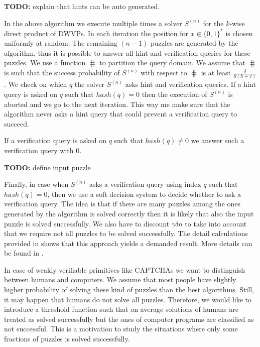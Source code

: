 \begin{todo}
  \textbf{TODO:} explain that hints can be auto generated.
\end{todo}

In the above algorithm we execute multiple times a solver $S^{(n)}$ for the $k$-wise direct product of DWVPs.
In each iteration the position for $x \in \{0,1\}^{*}$ is chosen uniformly at random.
The remaining $(n-1)$ puzzles are generated by the algorithm, thus it is possible to answer
all hint and verification queries for these puzzles.
We use a function $\hash$ to partition the query domain.
We assume that $\hash$ is such that the success probability of $S^{(n)}$ with respect to $\hash$ is at least $\frac{\delta}{8(h+v)}$.
We check on which $q$ the solver $S^{(n)}$ asks hint and verification queries.
If a hint query is asked on $q$ such that $hash(q) = 0$ then the execution of $S^{(n)}$
is aborted and we go to the next iteration. This way me make sure that the algorithm
never asks a hint query that could prevent a verification query to succeed.

If a verification query is asked on $q$ such that $hash(q) \neq 0$ we answer such a verification
query with $0$.

\begin{todo}
  \textbf{TODO:} define input puzzle
\end{todo}

Finally, in case when $S^{(n)}$ asks a verification query using index $q$ such that $hash(q) = 0$, then
we use a soft decision system to decide whether to ask a verification query.
The idea is that if there are many puzzles among the ones generated by the algorithm is solved correctly
then it is likely that also the input puzzle is solved successfully. We also have to discount
$\gamma\delta n$ to take into account that we require not all puzzles to be solved successfully.
The detail calculations provided in \cite{Dodis:2009:SAI:1530441.1530450} shows that this approach
yields a demanded result. More details can be found in \cite{Dodis:2009:SAI:1530441.1530450, impagliazzo2007chernoff}.

In case of weakly verifiable primitives like CAPTCHAs we want to distinguish between humans and computers.
We assume that most people have slightly higher probability of solving these kind of puzzles than the best algorithms.
Still, it may happen that humans do not solve all puzzles. Therefore, we would like to introduce a threshold function
such that on average solutions of humans are treated as solved successfully but the ones of computer programs are classified
as not successful. This is a motivation to study the situations where only some fractions of puzzles is solved successfully.

